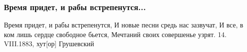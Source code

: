  
 
 

\subsubsection{Время придет, и рабы встрепенутся...}
\label{sec:poetry.rus.mihailo_grushevskii.vremja_pridet}

Время придет, и рабы встрепенутся,
И новые песни средь нас зазвучат,
И все, в ком лишь сердце свободное бьется,
Мечтаний своих совершенье узрят.
14. VIII.1883, хут[ор] Грушевский 
